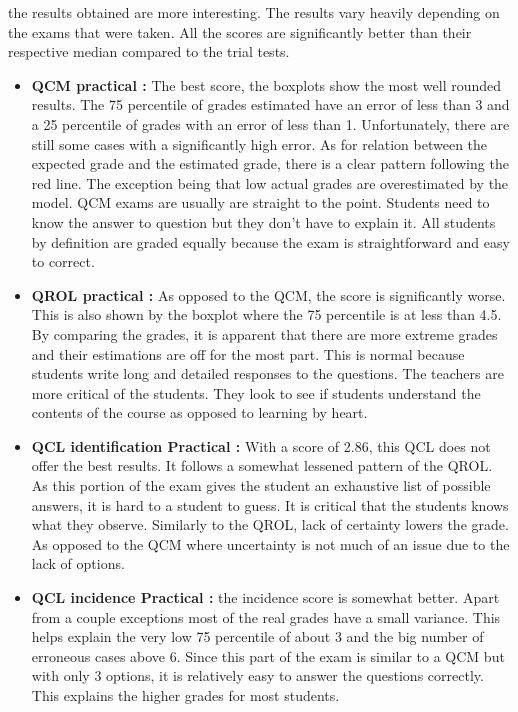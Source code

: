 \documentclass[a4paper,11pt]{report}
\numberwithin{figure}{section} %
\begin{document}
	the results obtained are more interesting.
	The results vary heavily depending on the exams that were taken.
	All the scores are significantly better than their respective median compared to the trial tests.
    \begin{itemize}
    \item[\textbullet]  \textbf{QCM practical :} The best score, the boxplots show the most well rounded results.
    The 75 percentile of grades estimated have an error of less than 3 and a 25 percentile of grades with an error of less than 1.
    Unfortunately, there are still some cases with a significantly high error.
    As for relation between the expected grade and the estimated grade, there is a clear pattern following the red line.
    The exception being that low actual grades are overestimated by the model.
    QCM exams are usually are straight to the point.
    Students need to know the answer to question but they don't have to explain it.
    All students by definition are graded equally because the exam is straightforward and easy to correct.
    \item[\textbullet]  \textbf{QROL practical :} As opposed to the QCM, the score is significantly worse.
    This is also shown by the boxplot where the 75 percentile is at less than 4.5. By comparing the grades, it is apparent that there are more extreme grades and their estimations are off for the most part.
    This is normal because students write long and detailed responses to the questions.
    The teachers are more critical of the students.
    They look to see if students understand the contents of the course as opposed to learning by heart.
    \item[\textbullet]  \textbf{QCL identification Practical :} With a score of 2.86, this QCL does not offer the best results.
    It follows a somewhat lessened pattern of the QROL. As this portion of the exam gives the student an exhaustive list of possible answers, it is hard to a student to guess.
    It is critical that the students knows what they observe.
    Similarly to the QROL, lack of certainty lowers the grade.
    As opposed to the QCM where uncertainty is not much of an issue due to the lack of options.
    \item[\textbullet]  \textbf{QCL incidence Practical :} the incidence score  is somewhat better.
    Apart from a couple exceptions most of the real grades have a small variance.
    This helps explain the very low 75 percentile of about 3 and the big number of erroneous cases above 6.
    Since this part of the exam is similar to a QCM but with only 3 options, it is relatively easy to answer the questions correctly.
    This explains the higher grades for most students.
    \end{itemize}
\end{document}
